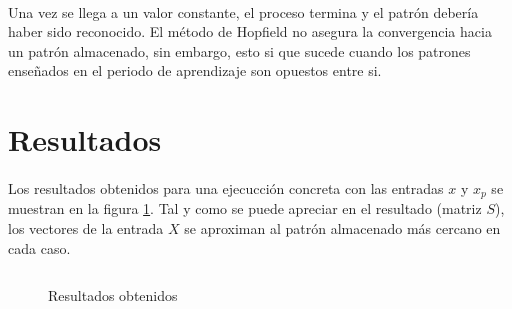 \documentclass[10pt, a4paper,spanish]{article}
\begin{document}
		\paragraph{}
		Una vez se llega a un valor constante, el proceso termina y el patrón debería haber sido reconocido. El método de Hopfield no asegura la convergencia hacia un patrón almacenado, sin embargo, esto si que sucede cuando los patrones enseñados en el periodo de aprendizaje son opuestos entre si.


	\section{Resultados}

		\paragraph{}
		Los resultados obtenidos para una ejecucción concreta con las entradas $x$ y $x_p$ se muestran en la figura \ref{results}. Tal y como se puede apreciar en el resultado (matriz $S$), los vectores de la entrada $X$ se aproximan al patrón almacenado más cercano en cada caso.

		\begin{figure}[htpb!]
			\centering
			\inputminted{bash}{../output.txt}
			\caption{Resultados obtenidos}
			\label{results}
		\end{figure}
\end{document}
